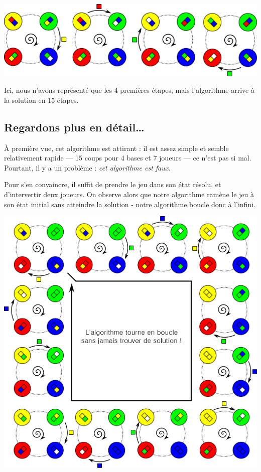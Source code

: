 \documentclass[a5paper,pagesize,DIV=14]{scrbook}
\begin{document}
\begin{center}
  \includegraphics[width=\linewidth]{img/baseball_ex1.pdf}
\end{center}

Ici, nous n'avons représenté que les 4 premières étapes, mais l'algorithme arrive à la solution en 15 étapes.

\subsection*{Regardons plus en détail{\ldots}}

À première vue, cet algorithme est attirant : il est assez simple et semble
relativement rapide --- 15 coups pour 4 bases et 7 joueurs --- ce n'est pas si mal. Pourtant, il y a un problème : \textit{cet algorithme est faux}. 

Pour s'en convaincre, il suffit de prendre le jeu dans son état résolu, et d'intervertir deux joueurs. On observe alors que notre algorithme ramène le jeu à son état initial sans atteindre la solution - notre algorithme boucle donc à l'infini.

\begin{center}
  \includegraphics[width=\linewidth]{img/baseball_ex2.pdf}
\end{center}
\end{document}
